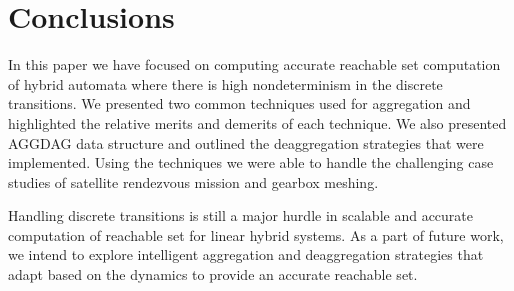 \documentclass[acmsmall]{acmart}
\begin{document}


\maketitle

%
%
%






\vspace{-0.2cm}
\section{Conclusions}
In this paper we have focused on computing accurate reachable set computation of hybrid automata where there is high nondeterminism in the discrete transitions. We presented two common techniques used for aggregation and highlighted the relative merits and demerits of each technique. We also presented AGGDAG data structure and outlined the deaggregation strategies that were implemented. Using the techniques we were able to handle the challenging case studies of satellite rendezvous mission and gearbox meshing.

Handling discrete transitions is still a major hurdle in scalable and accurate computation of reachable set for linear hybrid systems. As a part of future work, we intend to explore intelligent aggregation and deaggregation strategies that adapt based on the dynamics to provide an accurate reachable set.

\vspace{-0.2cm}


\end{document}
